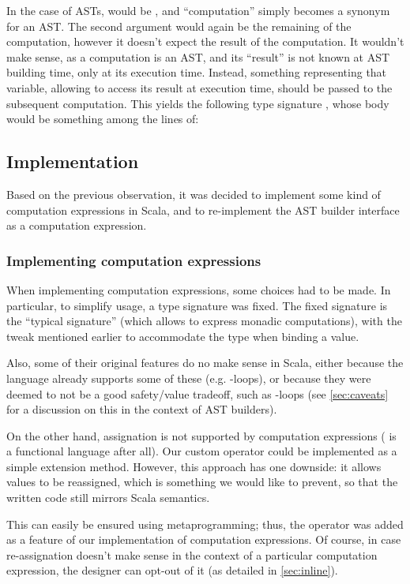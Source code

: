 In the case of ASTs,  would be ,
and ``computation'' simply becomes a synonym for an AST.
The second argument would again be the remaining of the computation,
however it doesn't expect the result of the computation. 
It wouldn't make sense, as a computation is an AST, and its ``result'' is not known at AST building time, only at its execution time.
Instead, something representing that variable, allowing to access its result at execution time, should be passed to the subsequent computation. 
This yields the following type signature 
,
whose body would be something among the lines of:


\subsection{Implementation}
Based on the previous observation,
it was decided to implement some kind of computation expressions in Scala, and to re-implement the AST builder interface as a computation expression.

\subsubsection{Implementing computation expressions}
When implementing computation expressions,
some choices had to be made. 
In particular, to simplify usage, a type signature was fixed. 
The fixed signature is the ``typical signature'' (which allows to express monadic computations), with the tweak mentioned earlier to accommodate the  type when binding a value.

Also, some of their original features do no make sense in Scala,
either because the language already supports some of these (e.g. -loops),
or because they were deemed to not be a good safety/value tradeoff,
such as -loops (see \cref{sec:caveats} for a discussion on this in the context of AST builders).

On the other hand,
assignation is not supported by computation expressions
(\Fsharp{} is a functional language after all).
Our custom operator \scalasnippet{=!} could be implemented as a simple extension method.
However, this approach has one downside: it allows values to be reassigned, which is something we would like to prevent, so that the written code still mirrors Scala semantics.

This can easily be ensured using metaprogramming; 
thus, the \scalasnippet{=!} operator was added as a feature of our implementation of computation expressions.
Of course, in case re-assignation doesn't make sense in the context of a particular computation expression, the designer can opt-out of it (as detailed in \cref{sec:inline}).

